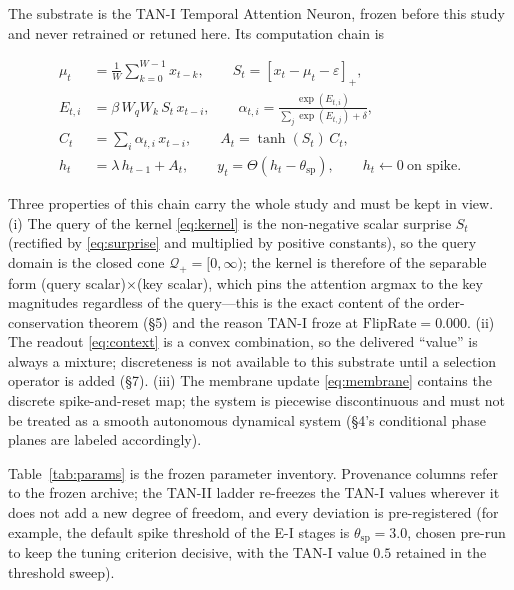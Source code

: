 The substrate is the TAN-I Temporal Attention Neuron, frozen before this
study and never retrained or retuned here. Its computation chain is

\begin{align}
\mu_t &= \frac{1}{W}\sum_{k=0}^{W-1} x_{t-k}, \qquad
S_t=[x_t-\mu_t-\varepsilon]_+,
\label{eq:surprise}\\
E_{t,i}&=\beta\,W_q W_k\,S_t\,x_{t-i}, \qquad
\alpha_{t,i}=\frac{\exp(E_{t,i})}{\sum_j\exp(E_{t,j})+\delta},
\label{eq:kernel}\\
C_t&=\sum_i \alpha_{t,i}\,x_{t-i}, \qquad
A_t=\tanh(S_t)\,C_t,
\label{eq:context}\\
h_t&=\lambda\,h_{t-1}+A_t, \qquad
y_t=\Theta(h_t-\theta_{\mathrm{sp}}), \qquad
h_t\leftarrow 0\ \text{on spike}.
\label{eq:membrane}
\end{align}

Three properties of this chain carry the whole study and must be kept in
view. (i) The query of the kernel \eqref{eq:kernel} is the non-negative
scalar surprise $S_t$ (rectified by \eqref{eq:surprise} and multiplied by
positive constants), so the query domain is the closed cone
$\mathcal{Q}_+=[0,\infty)$; the kernel is therefore of the separable form
(query scalar)$\times$(key scalar), which pins the attention argmax to the
key magnitudes regardless of the query---this is the exact content of the
order-conservation theorem (§5) and the reason TAN-I froze at
$\mathrm{FlipRate}=0.000$. (ii) The readout \eqref{eq:context} is a convex
combination, so the delivered ``value'' is always a mixture; discreteness is
not available to this substrate until a selection operator is added
(§7). (iii) The membrane update \eqref{eq:membrane} contains the discrete
spike-and-reset map; the system is piecewise discontinuous and must not be
treated as a smooth autonomous dynamical system (§4's conditional phase
planes are labeled accordingly).

Table~\ref{tab:params} is the frozen parameter inventory. Provenance
columns refer to the frozen archive; the TAN-II ladder re-freezes the TAN-I
values wherever it does not add a new degree of freedom, and every deviation
is pre-registered (for example, the default spike threshold of the E-I
stages is $\theta_{\mathrm{sp}}=3.0$, chosen pre-run to keep the tuning
criterion decisive, with the TAN-I value $0.5$ retained in the threshold
sweep).

